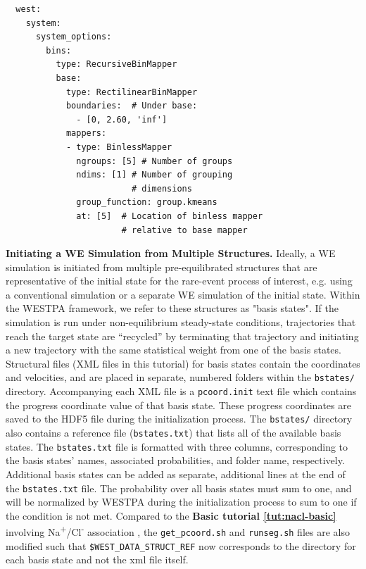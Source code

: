 \begin{verbatim}
  west:
    system:
      system_options:
        bins:
          type: RecursiveBinMapper
          base:
            type: RectilinearBinMapper
            boundaries:  # Under base:
              - [0, 2.60, 'inf']
            mappers:
            - type: BinlessMapper
              ngroups: [5] # Number of groups
              ndims: [1] # Number of grouping 
                         # dimensions
              group_function: group.kmeans
              at: [5]  # Location of binless mapper
                       # relative to base mapper
\end{verbatim} 

\textbf{Initiating a WE Simulation from Multiple Structures.} Ideally, a WE simulation is initiated from multiple pre-equilibrated structures that are representative of the initial state for the rare-event process of interest, e.g. using a conventional simulation or a separate WE simulation of the initial state.
Within the WESTPA framework, we refer to these structures as "basis states". 
If the simulation is run under non-equilibrium steady-state conditions, trajectories that reach the target state are “recycled” by terminating that trajectory and initiating a new trajectory with the same statistical weight from one of the basis states. 
Structural files (XML files in this tutorial) for basis states contain the coordinates and velocities, and are placed in separate, numbered folders within the \verb|bstates/| directory. 
Accompanying each XML file is a \verb|pcoord.init| text file which contains the progress coordinate value of that basis state. 
These progress coordinates are saved to the HDF5 file during the initialization process. 
The \verb|bstates/| directory also contains a reference file (\verb|bstates.txt|) that lists all of the available basis states. 
The \verb|bstates.txt| file is formatted with three columns, corresponding to the basis states’ names, associated probabilities, and folder name, respectively.
Additional basis states can be added as separate, additional lines at the end of the \verb|bstates.txt| file. 
The probability over all basis states must sum to one, and will be normalized by WESTPA during the initialization process to sum to one if the condition is not met.
Compared to the \textbf{Basic tutorial \ref{tut:nacl-basic}} involving Na\textsuperscript{+}/Cl\textsuperscript{-} association \citep{bogetti_suite_2019}, the \verb|get_pcoord.sh| and \verb|runseg.sh| files are also modified such that \verb|$WEST_DATA_STRUCT_REF| now corresponds to the directory for each basis state and not the xml file itself.

